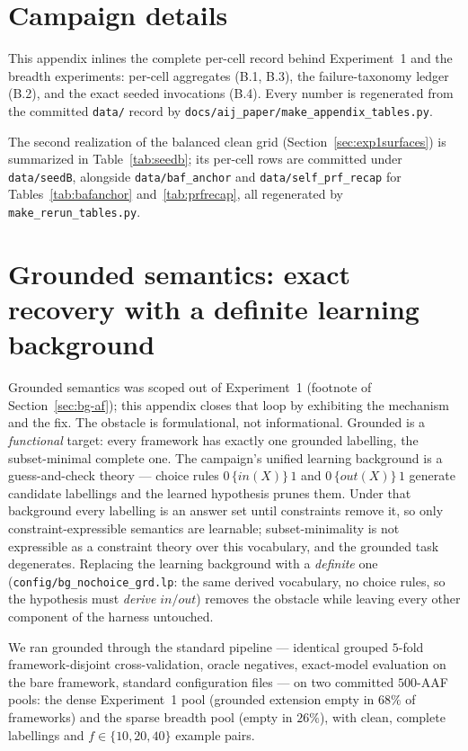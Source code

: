 \documentclass[review,12pt]{elsarticle}
\theoremstyle{definition}
\theoremstyle{remark}
\begin{document}
\section{Campaign details}
\label{app:campaign}
This appendix inlines the complete per-cell record behind Experiment~1 and the
breadth experiments: per-cell aggregates (B.1, B.3), the failure-taxonomy
ledger (B.2), and the exact seeded invocations (B.4). Every number is
regenerated from the committed \texttt{data/} record by
\texttt{docs/aij\_paper/make\_appendix\_tables.py}.



The second realization of the balanced clean grid (Section~\ref{sec:exp1surfaces})
is summarized in Table~\ref{tab:seedb}; its per-cell rows are committed under
\texttt{data/seedB}, alongside \texttt{data/baf\_anchor} and
\texttt{data/self\_prf\_recap} for Tables~\ref{tab:bafanchor}
and~\ref{tab:prfrecap}, all regenerated by \texttt{make\_rerun\_tables.py}.



\section{Grounded semantics: exact recovery with a definite learning background}
\label{app:grd}

Grounded semantics was scoped out of Experiment~1 (footnote of
Section~\ref{sec:bg-af}); this appendix closes that loop by exhibiting the
mechanism and the fix. The obstacle is formulational, not informational.
Grounded is a \emph{functional} target: every framework has exactly one
grounded labelling, the subset-minimal complete one. The campaign's unified
learning background is a guess-and-check theory --- choice rules
$0\,\{\mathit{in}(X)\}\,1$ and $0\,\{\mathit{out}(X)\}\,1$ generate candidate
labellings and the learned hypothesis prunes them. Under that background
every labelling is an answer set until constraints remove it, so only
constraint-expressible semantics are learnable; subset-minimality is not
expressible as a constraint theory over this vocabulary, and the grounded
task degenerates. Replacing the learning background with a \emph{definite}
one (\texttt{config/bg\_nochoice\_grd.lp}: the same derived vocabulary, no
choice rules, so the hypothesis must \emph{derive}
$\mathit{in}/\mathit{out}$) removes the obstacle while leaving every other
component of the harness untouched.

We ran grounded through the standard pipeline --- identical grouped $5$-fold
framework-disjoint cross-validation, oracle negatives, exact-model evaluation
on the bare framework, standard configuration files --- on two committed
$500$-AAF pools: the dense Experiment~1 pool (grounded extension empty in
$68\%$ of frameworks) and the sparse breadth pool (empty in $26\%$), with
clean, complete labellings and $f\in\{10,20,40\}$ example pairs.
\end{document}
